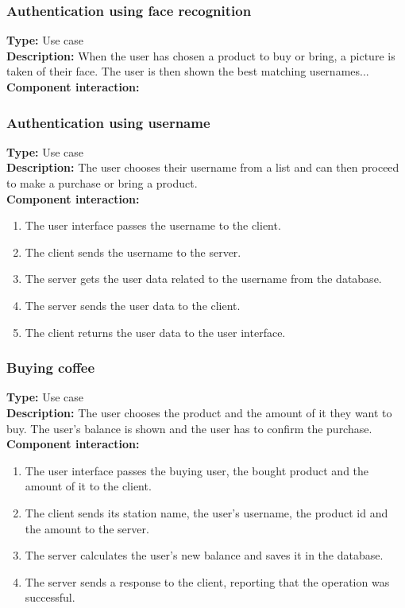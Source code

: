 \documentclass[11pt]{article}
\begin{document}
\subsubsection{Authentication using face recognition}
\textbf{Type:} Use case\\
\textbf{Description:} When the user has chosen a product to buy or bring, 
a picture is taken of their face. The user is then shown the best matching usernames...\\
\textbf{Component interaction:} \\
   
\subsubsection{Authentication using username}
\textbf{Type:} Use case\\
\textbf{Description:} The user chooses their username from a list and can then proceed to make a purchase or bring a product.\\
\textbf{Component interaction:} 
\begin{enumerate} 
\item{The user interface passes the username to the client.}
\item{The client sends the username to the server.}
\item{The server gets the user data related to the username from the database.}
\item{The server sends the user data to the client.}
\item{The client returns the user data to the user interface.}
\end{enumerate}

\subsubsection{Buying coffee}
\textbf{Type:} Use case\\
\textbf{Description:} The user chooses the product and the amount of it they want to buy. 
The user's balance is shown and the user has to confirm the purchase.\\
\textbf{Component interaction:}
\begin{enumerate} 
\item{The user interface passes the buying user, the bought product and the amount of it to the client.}
\item{The client sends its station name, the user's username, the product id and the amount to the server.}
\item{The server calculates the user's new balance and saves it in the database.}
\item{The server sends a response to the client, reporting that the operation was successful.}
\end{enumerate}
\end{document}
